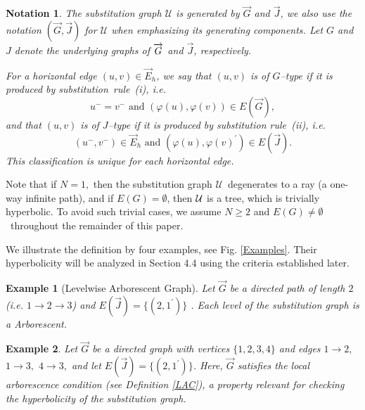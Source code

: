 \documentclass[reqno]{amsart}
\theoremstyle{plain}
\newtheorem{example}{Example}
\newtheorem{notation}{Notation}
\numberwithin{equation}{section}
\begin{document}
\begin{notation}
The substitution graph $\mathcal{U}$ is generated by $\overrightarrow{G}$
and $\overrightarrow{J}$, we also use the notation $(\overrightarrow{G},%
\overrightarrow{J})$ for $\mathcal{U}$ when emphasizing its generating
components. Let $G$ and $J$ denote the underlying graphs of $\overrightarrow{%
G}$ and $\overrightarrow{J}$, respectively.

For a horizontal edge $(u,v)\in \vec{E}_{h}$, we say that $(u,v)$ is \emph{%
of $G$--type} if it is produced by substitution\emph{\ }rule~(i), i.e.%
\begin{equation*}
u^{-}=v^{-}\text{ and }(\varphi (u),\varphi (v))\in E(\vec{G}),
\end{equation*}%
and that $(u,v)$ is \emph{of $J$--type} if it is produced by substitution
rule~(ii), i.e. 
\begin{equation*}
(u^{-},v^{-})\in \vec{E}_{h}\text{ and }(\varphi (u),\varphi (v)^{\prime
})\in E(\vec{J}).
\end{equation*}%
This classification is unique for each horizontal edge.
\end{notation}

Note that if $N=1,$ then the substitution graph $\mathcal{U}$\ degenerates
to a ray (a one-way infinite path), and if $E(G)=\emptyset $, then $\mathcal{%
U}$ is a tree, which is trivially hyperbolic. To avoid such trivial cases,
we assume $N\geq 2$ and $E(G)\neq \emptyset $\ throughout the remainder of
this paper.

We illustrate the definition by four examples, see Fig. \ref{Examples}.
Their hyperbolicity will be analyzed in Section 4.4 using the criteria
established later.

\begin{example}[Levelwise Arborescent Graph]
\label{exa1}Let $\overrightarrow{G}$ be a directed path of length $2$ (i.e. $%
1\rightarrow 2\rightarrow 3$) and $E(\overrightarrow{J})=\{(2,1^{\prime })\}$%
. Each level of the substitution graph is a Arborescent.
\end{example}

\begin{example}
\label{exa2}Let $\overrightarrow{G}$ be a directed graph with vertices $%
\{1,2,3,4\}$ and edges $1\rightarrow 2,$ $1\rightarrow 3,$ $4\rightarrow 3,$
and let $E(\overrightarrow{J})=\{(2,1^{\prime })\}$. Here, $\overrightarrow{G%
}$ satisfies the local arborescence condition (see Definition \ref{LAC}), a
property relevant for checking the hyperbolicity of the substitution graph.
\end{example}
\end{document}
